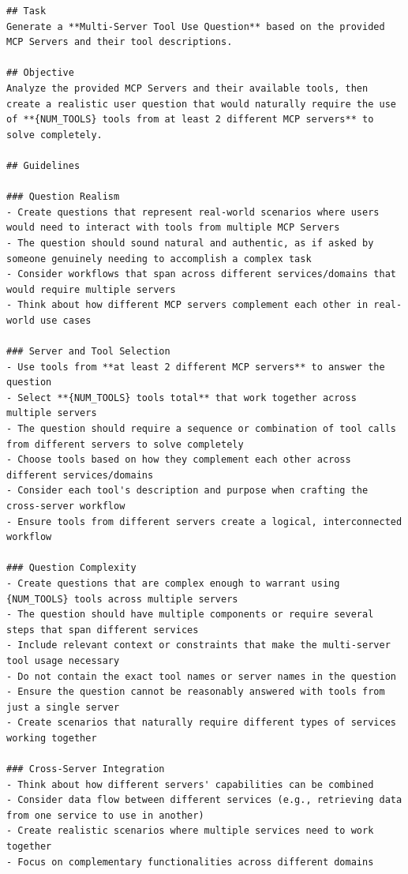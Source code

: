 \begin{verbatim}
## Task
Generate a **Multi-Server Tool Use Question** based on the provided MCP Servers and their tool descriptions.

## Objective
Analyze the provided MCP Servers and their available tools, then create a realistic user question that would naturally require the use of **{NUM_TOOLS} tools from at least 2 different MCP servers** to solve completely.

## Guidelines

### Question Realism
- Create questions that represent real-world scenarios where users would need to interact with tools from multiple MCP Servers
- The question should sound natural and authentic, as if asked by someone genuinely needing to accomplish a complex task
- Consider workflows that span across different services/domains that would require multiple servers
- Think about how different MCP servers complement each other in real-world use cases

### Server and Tool Selection
- Use tools from **at least 2 different MCP servers** to answer the question
- Select **{NUM_TOOLS} tools total** that work together across multiple servers
- The question should require a sequence or combination of tool calls from different servers to solve completely
- Choose tools based on how they complement each other across different services/domains
- Consider each tool's description and purpose when crafting the cross-server workflow
- Ensure tools from different servers create a logical, interconnected workflow

### Question Complexity
- Create questions that are complex enough to warrant using {NUM_TOOLS} tools across multiple servers
- The question should have multiple components or require several steps that span different services
- Include relevant context or constraints that make the multi-server tool usage necessary
- Do not contain the exact tool names or server names in the question
- Ensure the question cannot be reasonably answered with tools from just a single server
- Create scenarios that naturally require different types of services working together

### Cross-Server Integration
- Think about how different servers' capabilities can be combined
- Consider data flow between different services (e.g., retrieving data from one service to use in another)
- Create realistic scenarios where multiple services need to work together
- Focus on complementary functionalities across different domains


\end{verbatim}
